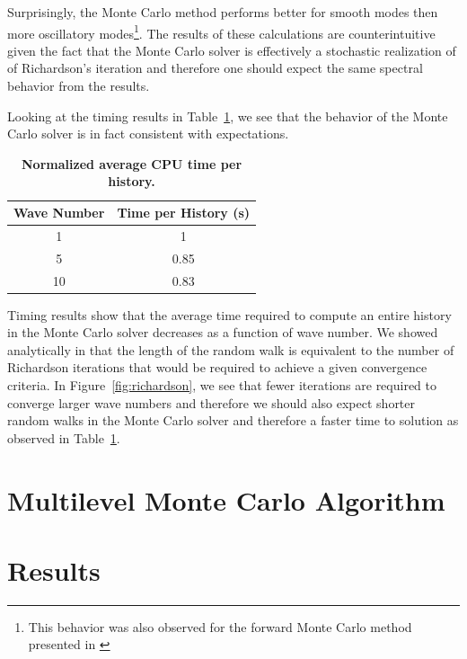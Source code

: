 \documentclass[note]{TechNote}
\begin{document}
Surprisingly, the Monte Carlo method performs better for smooth modes
then more oscillatory modes\footnote{This behavior was also observed
  for the forward Monte Carlo method presented in
  \cite{evans_monte_2012}}. The results of these calculations are
counterintuitive given the fact that the Monte Carlo solver is
effectively a stochastic realization of of Richardson's iteration and
therefore one should expect the same spectral behavior from the
results. 

Looking at the timing results in Table~\ref{tab:mc_timing}, we see
that the behavior of the Monte Carlo solver is in fact consistent with
expectations.
\begin{table}[h!]
  \begin{center}
    \begin{tabular}{cc}\hline\hline
      \multicolumn{1}{c}{\textbf{Wave Number}} & 
      \multicolumn{1}{c}{\textbf{Time per History (s)}} \\
      \hline
      1 & 1 \\
      5 & 0.85 \\
      10 & 0.83 \\
      \hline\hline
    \end{tabular}
  \end{center}
  \caption{\textbf{Normalized average CPU time per history.}}
  \label{tab:mc_timing}
\end{table}
Timing results show that the average time required to compute an
entire history in the Monte Carlo solver decreases as a function of
wave number. We showed analytically in \cite{slattery_2013} that the
length of the random walk is equivalent to the number of Richardson
iterations that would be required to achieve a given convergence
criteria. In Figure~\ref{fig:richardson}, we see that fewer iterations
are required to converge larger wave numbers and therefore we should
also expect shorter random walks in the Monte Carlo solver and
therefore a faster time to solution as observed in
Table~\ref{tab:mc_timing}.

\section{Multilevel Monte Carlo Algorithm}
\label{sec:algorithm}

\section{Results}
\label{sec:results}




\closing
\caution
\end{document}

